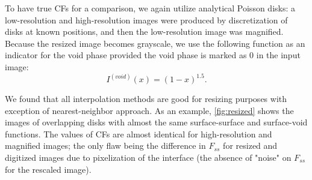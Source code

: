 \documentclass[reprint,amsmath,amssymb,aps,pre,showkeys,showpacs]{revtex4-1}
\begin{document}
To have true CFs for a comparison, we again utilize analytical Poisson disks: a
low-resolution and high-resolution images were produced by discretization of
disks at known positions, and then the low-resolution image was
magnified. Because the resized image becomes grayscale, we use the following
function as an indicator for the void phase provided the void phase is marked as
0 in the input image:
\begin{equation*}
  I^{(void)}(x) = (1 - x)^{1.5}.
\end{equation*}

We found that all interpolation methods are good for resizing purposes with
exception of nearest-neighbor approach. As an example, \cref{fig:resized} shows
the images of overlapping disks with almost the same surface-surface and
surface-void functions. The values of CFs are almost identical for
high-resolution and magnified images; the only flaw being the difference in
$F_{ss}$ for resized and digitized images due to pixelization of the interface
(the absence of "noise" on $F_{ss}$ for the rescaled image).
\end{document}
